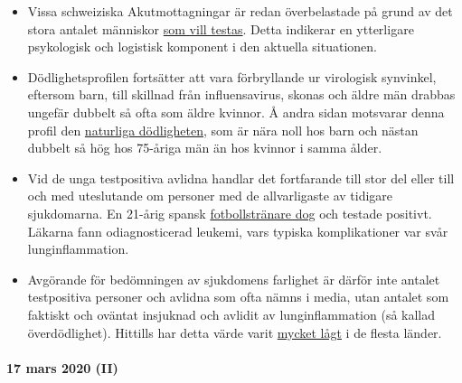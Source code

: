 \begin{itemize}
\tightlist
\item
  Vissa schweiziska Akutmottagningar är redan överbelastade på grund av
  det stora antalet människor
  \href{https://insideparadeplatz.ch/2020/03/16/notfall-stationen-bereits-seit-tagen-am-anschlag/}{som
  vill testas}. Detta indikerar en ytterligare psykologisk och logistisk
  komponent i den aktuella situationen.
\item
  Dödlighetsprofilen fortsätter att vara förbryllande ur virologisk
  synvinkel, eftersom barn, till skillnad från influensavirus, skonas
  och äldre män drabbas ungefär dubbelt så ofta som äldre kvinnor. Å
  andra sidan motsvarar denna profil den
  \href{http://www.gbe-bund.de/gbe10/abrechnung.prc_abr_test_logon?p_uid=gast\&p_aid=0\&p_knoten=FID\&p_sprache=D\&p_suchstring=820}{naturliga
  dödligheten}, som är nära noll hos barn och nästan dubbelt så hög hos
  75-åriga män än hos kvinnor i samma ålder.
\item
  Vid de unga testpositiva avlidna handlar det fortfarande till stor del
  eller till och med uteslutande om personer med de allvarligaste av
  tidigare sjukdomarna. En 21-årig spansk
  \href{https://www.msn.com/de-ch/news/other/spanischer-nachwuchs-trainer-stirbt-an-corona/ar-BB11gT64}{fotbollstränare
  dog} och testade positivt. Läkarna fann odiagnosticerad leukemi, vars
  typiska komplikationer var svår lunginflammation.
\item
  Avgörande för bedömningen av sjukdomens farlighet är därför inte
  antalet testpositiva personer och avlidna som ofta nämns i media, utan
  antalet som faktiskt och oväntat insjuknad och avlidit av
  lunginflammation (så kallad överdödlighet). Hittills har detta värde
  varit \href{https://www.euromomo.eu/index.html}{mycket lågt} i de
  flesta länder.
\end{itemize}

\hypertarget{17-mars-2020-ii}{%
\paragraph{17 mars 2020 (II)}\label{17-mars-2020-ii}}


